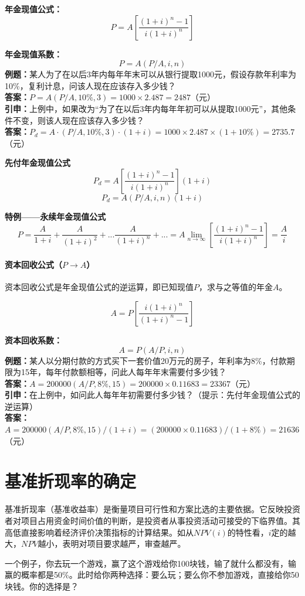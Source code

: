 \documentclass[12pt, a4paper, oneside]{ctexbook}
\begin{document}
\textbf{年金现值公式：}
$$P=A[\frac{(1+i)^n-1}{i(1+i)^n}]$$

\textbf{年金现值系数：}
$$P=A(P/A,i,n)$$
\textbf{例题：}某人为了在以后3年内每年年末可以从银行提取1000元，假设存款年利率为10\%，复利计息，问该人现在应该存入多少钱？\\
\textbf{答案：}$P=A(P/A,10\%,3)=1000 \times 2.487=2487$（元）\\
\textbf{引申：}上例中，如果改为“为了在以后3年内每年年初可以从提取1000元”，其他条件不变，则该人现在应该存入多少钱？\\
\textbf{答案：}$P_d=A \cdot (P/A,10\%,3) \cdot (1+i) =1000 \times 2.487 \times (1+10\%)=2735.7$（元）

\textbf{先付年金现值公式}
$$P_d=A[\frac{(1+i)^n-1}{i(1+i)^n}](1+i)$$
$$P_d=A(P/A,i,n)(1+i)$$

\textbf{特例——永续年金现值公式}
$$P=\frac{A}{1+i}+\frac{A}{(1+i)^2}+...\frac{A}{(1+i)^n}+...=A\lim_{n \to \infty}[\frac{(1+i)^n-1}{i(1+i)^n}]=\frac{A}{i}$$

\subsubsection{资本回收公式（$P \to A$）}
资本回收公式是年金现值公式的逆运算，即已知现值$P$，求与之等值的年金$A$。

$$A=P[\frac{i(1+i)^n}{(1+i)^n-1}]$$

\textbf{资本回收系数：}
$$A=P(A/P,i,n)$$
\textbf{例题：}某人以分期付款的方式买下一套价值20万元的房子，年利率为8\%，付款期限为15年，每年付款额相等，问此人每年年末需要付多少钱？\\
\textbf{答案：}$A=200000(A/P,8\%,15)=200000 \times 0.11683=23367$（元）\\
\textbf{引申：}在上例中，如问此人每年年初需要付多少钱？（提示：先付年金现值公式的逆运算）\\
\textbf{答案：}$A=200000(A/P,8\%,15)/(1+i)=(200000 \times 0.11683)/(1+8\%)=21636$（元）


\chapter{基准折现率的确定}
基准折现率（基准收益率）是衡量项目可行性和方案比选的主要依据。它反映投资者对项目占用资金时间价值的判断，是投资者从事投资活动可接受的下临界值。其高低直接影响着经济评价决策指标的计算结果。如从$NPV(i)$的特性看，$i$定的越大，$NPV$越小，表明对项目要求越严，审查越严。

一个例子，你去玩一个游戏，赢了这个游戏给你100块钱，输了就什么都没有，输赢的概率都是50\%。此时给你两种选择：要么玩；要么你不参加游戏，直接给你50块钱。你的选择是？
\end{document}
